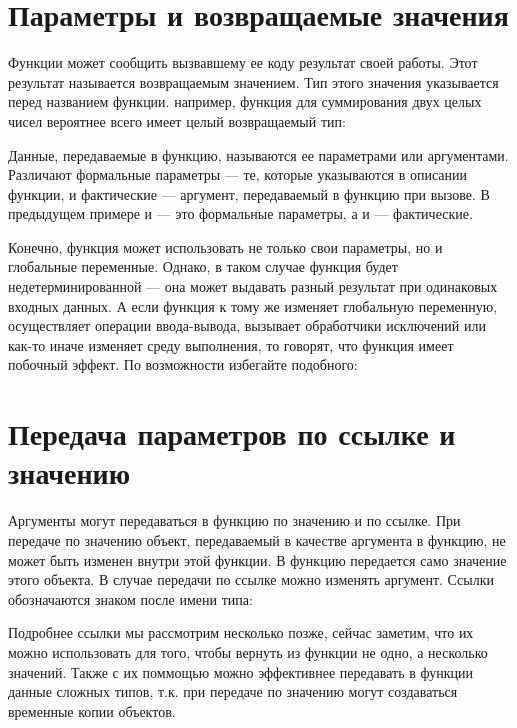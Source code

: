 \documentclass[book.tex]{subfiles}
\begin{document}
\section*{Параметры и возвращаемые значения}

Функции может сообщить вызвавшему ее коду результат своей работы. Этот результат называется возвращаемым значением. Тип этого значения указывается перед названием функции. например, функция для суммирования двух целых чисел вероятнее всего имеет целый возвращаемый тип:


Данные, передаваемые в функцию, называются ее параметрами или аргументами. Различают формальные параметры --- те, которые указываются в описании функции, и фактические --- аргумент, передаваемый в функцию при вызове. В предыдущем примере  и  --- это формальные параметры, а  и  --- фактические.

Конечно, функция может использовать не только свои параметры, но и глобальные переменные. Однако, в таком случае функция будет недетерминированной --- она может выдавать разный результат при одинаковых входных данных. А если функция к тому же изменяет глобальную переменную, осуществляет операции ввода-вывода, вызывает обработчики исключений или как-то иначе изменяет среду выполнения, то говорят, что функция имеет побочный эффект. По возможности избегайте подобного:


\section*{Передача параметров по ссылке и значению}

Аргументы могут передаваться в функцию по значению и по ссылке. При передаче по значению объект, передаваемый в качестве аргумента в функцию, не может быть изменен внутри этой функции. В функцию передается само значение этого объекта. В случае передачи по ссылке можно изменять аргумент. Ссылки обозначаются знаком \cppword{\&} после имени типа:


Подробнее ссылки мы рассмотрим несколько позже, сейчас заметим, что их можно использовать для того, чтобы вернуть из функции не одно, а несколько значений. Также с их поммощью можно эффективнее передавать в функции данные сложных типов, т.к. при передаче по значению могут создаваться временные копии объектов.
\end{document}
